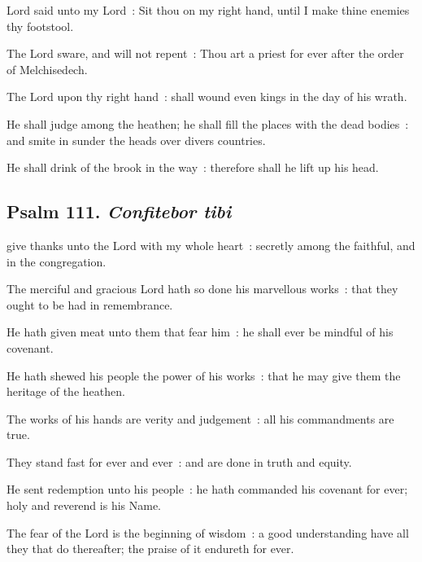  Lord said unto my Lord~: Sit thou on my right hand, until I make thine enemies thy footstool.\par
{}
The Lord sware, and will not repent~: Thou art a priest for ever after the order of Melchisedech.\par
{}The Lord upon thy right hand~: shall wound even kings in the day of his wrath.\par
{}He shall judge among the heathen; he shall fill the places with the dead bodies~: and smite in sunder the heads over divers countries.\par
{}He shall drink of the brook in the way~: therefore shall he lift up his head.\par

\subsection{Psalm 111. \textit{Confitebor tibi}}

 give thanks unto the Lord with my whole heart~: secretly among the faithful, and in the congregation.\par
{}
The merciful and gracious Lord hath so done his marvellous works~: that they ought to be had in remembrance.\par
{}He hath given meat unto them that fear him~: he shall ever be mindful of his covenant.\par
{}He hath shewed his people the power of his works~: that he may give them the heritage of the heathen.\par
{}The works of his hands are verity and judgement~: all his commandments are true.\par
{}They stand fast for ever and ever~: and are done in truth and equity.\par
{}He sent redemption unto his people~: he hath commanded his covenant for ever; holy and reverend is his Name.\par
{}The fear of the Lord is the beginning of wisdom~: a good understanding have all they that do thereafter; the praise of it endureth for ever.\par

